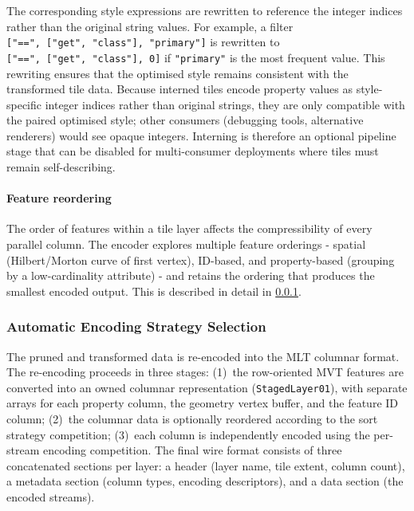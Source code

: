 The corresponding style expressions are rewritten to reference the integer indices rather than the original string values.
For example, a filter \texttt{["==",~["get",~"class"],~"primary"]} is rewritten to \texttt{["==",~["get",~"class"],~0]} if \texttt{"primary"} is the most frequent value.
This rewriting ensures that the optimised style remains consistent with the transformed tile data.
Because interned tiles encode property values as style-specific integer indices rather than original strings, they are only compatible with the paired optimised style; other consumers (debugging tools, alternative renderers) would see opaque integers.
Interning is therefore an optional pipeline stage that can be disabled for multi-consumer deployments where tiles must remain self-describing.

\paragraph{Feature reordering}
The order of features within a tile layer affects the compressibility of every parallel column.
The encoder explores multiple feature orderings - spatial (Hilbert/Morton curve of first vertex), ID-based, and property-based (grouping by a low-cardinality attribute) - and retains the ordering that produces the smallest encoded output.
This is described in detail in \cref{sub_encoding_strategies}.

\subsubsection{Automatic Encoding Strategy Selection}\label{sub_encoding_strategies}

The pruned and transformed data is re-encoded into the \ac{MLT} columnar format.
The re-encoding proceeds in three stages: (1)~the row-oriented \ac{MVT} features are converted into an owned columnar representation (\texttt{StagedLayer01}), with separate arrays for each property column, the geometry vertex buffer, and the feature ID column; (2)~the columnar data is optionally reordered according to the sort strategy competition; (3)~each column is independently encoded using the per-stream encoding competition.
The final wire format consists of three concatenated sections per layer: a header (layer name, tile extent, column count), a metadata section (column types, encoding descriptors), and a data section (the encoded streams).

